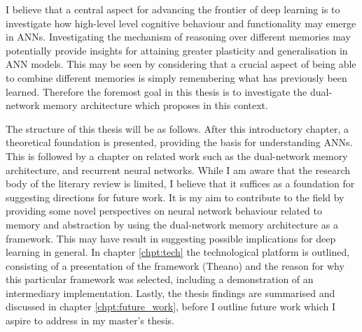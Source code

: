 I believe that a central aspect for advancing the frontier of deep learning is to investigate how high-level level cognitive behaviour and functionality may emerge in ANNs. Investigating the mechanism of reasoning over different memories may potentially provide insights for attaining greater plasticity and generalisation in ANN models. This may be seen by considering that a crucial aspect of being able to combine different memories is simply remembering what has previously been learned. Therefore the foremost goal in this thesis is to investigate the dual-network memory architecture which \cite{Hattori2014} proposes in this context.

The structure of this thesis will be as follows. After this introductory chapter, a theoretical foundation is presented, providing the basis for understanding ANNs. This is followed by a chapter on related work such as the dual-network memory architecture, and recurrent neural networks. While I am aware that the research body of the literary review is limited, I believe that it suffices as a foundation for suggesting directions for future work. It is my aim to contribute to the field by providing some novel perspectives on neural network behaviour related to memory and abstraction by using the dual-network memory architecture as a framework. This may have result in suggesting possible implications for deep learning in general. In chapter \ref{chpt:tech} the technological platform is outlined, consisting of a presentation of the framework (Theano) and the reason for why this particular framework was selected, including a demonstration of an intermediary implementation. Lastly, the thesis findings are summarised and discussed in chapter \ref{chpt:future_work}, before I outline future work which I aspire to address in my master's thesis.


\cleardoublepage